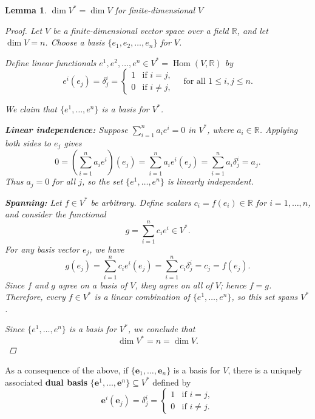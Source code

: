 \documentclass[11pt]{article}
\newtheorem{lemma}{Lemma}
\begin{document}
\begin{lemma}
$\dim V^* = \dim V$ for finite-dimensional $V$

\begin{proof}

Let $V$ be a finite-dimensional vector space over a field $\mathbb{R}$, and let $\dim V = n$.  
Choose a basis $\{e_1, e_2, \dots, e_n\}$ for $V$.

Define linear functionals $e^1, e^2, \dots, e^n \in V^* = \operatorname{Hom}(V, \mathbb{R})$ by
\[
e^i(e_j) = \delta^i_j =
\begin{cases}
1 & \text{if } i = j, \\
0 & \text{if } i \ne j,
\end{cases}
\quad \text{for all } 1 \le i,j \le n.
\]

We claim that $\{e^1, \dots, e^n\}$ is a basis for $V^*$.

\medskip

\noindent\textbf{Linear independence:}  
Suppose $\sum_{i=1}^n a_i e^i = 0$ in $V^*$, where $a_i \in \mathbb{R}$.  
Applying both sides to $e_j$ gives
\[
0 = \left( \sum_{i=1}^n a_i e^i \right)(e_j) = \sum_{i=1}^n a_i e^i(e_j) = \sum_{i=1}^n a_i \delta^i_j = a_j.
\]
Thus $a_j = 0$ for all $j$, so the set $\{e^1, \dots, e^n\}$ is linearly independent.

\medskip

\noindent\textbf{Spanning:}  
Let $f \in V^*$ be arbitrary. Define scalars $c_i = f(e_i) \in \mathbb{R}$ for $i = 1, \dots, n$, and consider the functional
\[
g = \sum_{i=1}^n c_i e^i \in V^*.
\]
For any basis vector $e_j$, we have
\[
g(e_j) = \sum_{i=1}^n c_i e^i(e_j) = \sum_{i=1}^n c_i \delta^i_j = c_j = f(e_j).
\]
Since $f$ and $g$ agree on a basis of $V$, they agree on all of $V$; hence $f = g$.  
Therefore, every $f \in V^*$ is a linear combination of $\{e^1, \dots, e^n\}$, so this set spans $V^*$.

\medskip

Since $\{e^1, \dots, e^n\}$ is a basis for $V^*$, we conclude that
\[
\dim V^* = n = \dim V.
\]

\end{proof}
\end{lemma}








As a consequence of the above, if $ \{ \mathbf{e}_1, \dots, \mathbf{e}_n \} $ is a basis for $ V $, there is a uniquely associated \textbf{dual basis} $ \{ \mathbf{e}^1, \dots, \mathbf{e}^n \} \subseteq V^* $ defined by
    \[
    \mathbf{e}^i(\mathbf{e}_j) = \delta^i_j =
    \begin{cases}
    1 & \text{if } i = j, \\
    0 & \text{if } i \ne j.
    \end{cases}
    \]
    
\end{document}
